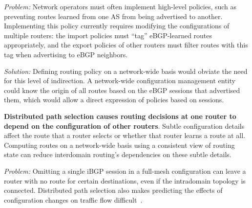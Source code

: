 \vspace{0.05in}
\noindent
{\em Problem:} Network operators must often implement high-level policies,
such as preventing routes learned from one AS from being advertised to
another.  Implementing this policy currently requires modifying the
configurations of multiple routers: the import policies must ``tag''
eBGP-learned routes appropriately, and the export policies of other
routers must filter routes with this tag when advertising to eBGP
neighbors.  

\vspace{0.05in}
\noindent
{\em Solution:} Defining routing policy on a network-wide basis would
obviate the need for this level of indirection.  A network-wide
configuration management entity could know the origin of all routes
based on the eBGP sessions that advertised them, which would allow
a direct expression of policies based on sessions.
\vspace{0.05in}


{\bf Distributed path selection causes routing decisions at one router
  to depend on the configuration of other routers}.  Subtle
  configuration details
  affect the route that a router selects or whether that router learns a
  route at all.  Computing routes on a network-wide basis using a
  consistent view of routing state can reduce interdomain routing's
  dependencies on these subtle details.
%

\vspace{0.05in}
\noindent
{\em Problem:} 
Omitting a single iBGP
session in a full-mesh configuration can leave a router with no route
for certain destinations, even if the intradomain topology is connected.
Distributed path selection also makes 
predicting the effects of configuration changes on traffic
flow difficult~\cite{Feamster2004}. 

